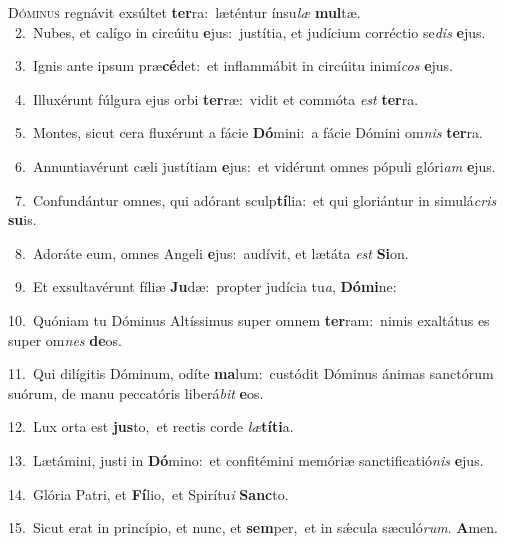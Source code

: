 \lettrine{\initial\textcolor{\initialcolor}{D}}{óminus} regnávit exsúltet \textbf{ter}\-ra:~\star læténtur ínsu\textit{læ} \textbf{mul}\-tæ.\\
{\numbfont\textcolor{\numbcolor}{~2.}}~Nubes, et calígo in circúitu \textbf{e}\-jus:~\star justítia, et judícium corréctio se\textit{dis} \textbf{e}\-jus.\par
{\numbfont\textcolor{\numbcolor}{~3.}}~Ignis ante ipsum præ\-\textbf{cé}\-det:~\star et inflammábit in circúitu inimí\textit{cos} \textbf{e}\-jus.\par
{\numbfont\textcolor{\numbcolor}{~4.}}~Illuxérunt fúlgura ejus orbi \textbf{ter}\-ræ:~\star vidit et commóta \textit{est} \textbf{ter}\-ra.\par
{\numbfont\textcolor{\numbcolor}{~5.}}~Montes, sicut cera fluxérunt a fácie \textbf{Dó}\-mini:~\star a fácie Dómini om\textit{nis} \textbf{ter}\-ra.\par
{\numbfont\textcolor{\numbcolor}{~6.}}~Annuntiavérunt cæli justítiam \textbf{e}\-jus:~\star et vidérunt omnes pópuli glóri\textit{am} \textbf{e}\-jus.\par
{\numbfont\textcolor{\numbcolor}{~7.}}~Confundántur omnes, qui adórant sculp\-\textbf{tí}\-lia:~\star et qui gloriántur in simulá\textit{cris} \textbf{su}\-is.\par
{\numbfont\textcolor{\numbcolor}{~8.}}~Adoráte eum, omnes Angeli \textbf{e}\-jus:~\star audívit, et lætáta \textit{est} \textbf{Si}\-on.\par
{\numbfont\textcolor{\numbcolor}{~9.}}~Et exsultavérunt fíliæ \textbf{Ju}\-dæ:~\star propter judícia tu\-\textit{a}\-, \textbf{Dó}\-\textbf{mi}ne:\par
{\numbfont\textcolor{\numbcolor}{10.}}~Quóniam tu Dóminus Altíssimus super omnem \textbf{ter}\-ram:~\star nimis exaltátus es super om\textit{nes} \textbf{de}\-os.\par
{\numbfont\textcolor{\numbcolor}{11.}}~Qui dilígitis Dóminum, odíte \textbf{ma}\-lum:~\star custódit Dóminus ánimas sanctórum suórum, de manu peccatóris liberá\textit{bit} \textbf{e}\-os.\par
{\numbfont\textcolor{\numbcolor}{12.}}~Lux orta est \textbf{jus}\-to,~\star et rectis corde \textit{læ}\-\textbf{tí}\textbf{ti}a.\par
{\numbfont\textcolor{\numbcolor}{13.}}~Lætámini, justi in \textbf{Dó}\-mino:~\star et confitémini memóriæ sanctificatió\textit{nis} \textbf{e}\-jus.\par
{\numbfont\textcolor{\numbcolor}{14.}}~Glória Patri, et \textbf{Fí}\-lio,~\star et Spirítu\textit{i} \textbf{Sanc}\-to.\par
{\numbfont\textcolor{\numbcolor}{15.}}~Sicut erat in princípio, et nunc, et \textbf{sem}\-per,~\star et in sǽcula sæculó\-\textit{rum}\-. \textbf{A}\-men.\par

